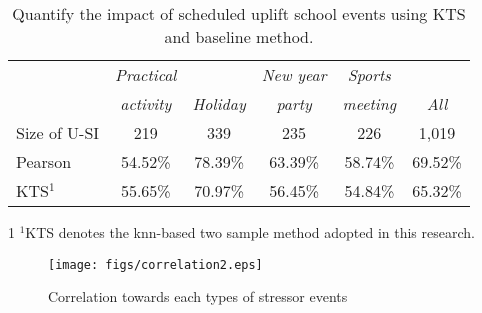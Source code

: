 \begin{table}
\begin{center}
\caption{Quantify the impact of scheduled uplift school events using KTS and baseline method.}
\begin{tabular}{l c c c c c} \\ \hline \hline
&	\emph{Practical}	&	         	&	\emph{New year}	&	\emph{Sports}	&	\emph{}	\\
&	\emph{activity}	&	\emph{Holiday}	&	\emph{party}	&	\emph{meeting}	&	\emph{All}	\\ \hline
Size of U-SI	&	219 	&	339 	&	235 	&	226 	&	1,019 	\\
Pearson         &54.52\%	&	78.39\%	&	63.39\%	&	58.74\%	&	69.52\% \\
KTS$^1$             &55.65\%	&	70.97\%	&	56.45\%	&	54.84\%	&	65.32\% \\
\hline \hline
\end{tabular}
\begin{tablenotes}
\footnotesize
\item[1] $^1$KTS denotes the knn-based two sample method adopted in this research.
\end{tablenotes}
\label{tab:schedule}
\end{center}
\end{table}


\begin{figure}
\centering
\caption{Correlation towards each types of stressor events}
\texttt{[image: figs/correlation2.eps]}%
\label{fig:correlation}
\end{figure}

